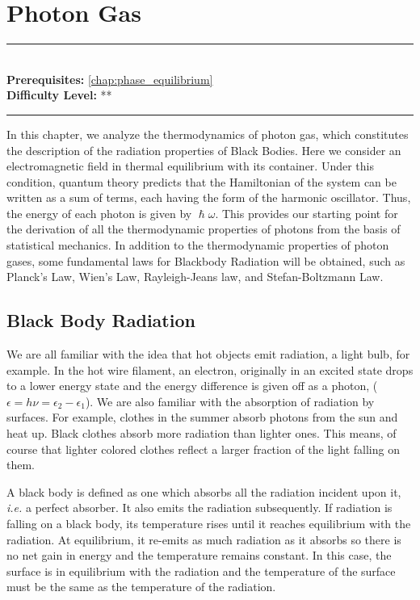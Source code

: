 \documentclass[book.tex]{subfiles}
\begin{document}
\chapter{Photon Gas}

\label{chap:photons}
\noindent\rule{11cm}{0.4pt} \\
\textbf{Prerequisites:}  \autoref{chap:phase_equilibrium}  \\
\textbf{Difficulty Level:} ** \\
\noindent\rule{11cm}{0.4pt}
\vspace{5mm}

In this chapter, we analyze the thermodynamics of photon gas, which constitutes the description of the radiation properties of Black Bodies. Here we consider an electromagnetic field in thermal equilibrium with its container. Under this condition, quantum theory predicts that the Hamiltonian of the system can be written as a sum of terms, each having the form of the harmonic oscillator. Thus, the energy of each photon is given by $\hslash\omega$. This provides our starting point for the derivation of all the thermodynamic properties of photons from the basis of statistical mechanics. In addition to the thermodynamic properties of photon gases, some fundamental laws for Blackbody Radiation will be obtained, such as Planck's Law, Wien's Law, Rayleigh-Jeans law, and Stefan-Boltzmann Law.

\section{Black Body Radiation}

We are all familiar with the idea that hot objects emit radiation, a light
bulb, for example. In the hot wire filament, an electron, originally in an excited
state drops to a lower energy state and the energy difference is given off as
a photon, ($\epsilon = h\nu = \epsilon_2 -\epsilon_1$). We are also familiar with the absorption of radiation by surfaces. For example, clothes in the summer absorb photons from the sun and heat up. Black clothes absorb more radiation than lighter ones. This means, of course that lighter colored clothes reflect a larger fraction of the light falling on them.

A black body is defined as one which absorbs all the radiation incident upon it, \textit{i.e.} a perfect absorber. It also emits the radiation subsequently. If radiation is falling on a black body, its temperature rises until it reaches equilibrium with the radiation. At equilibrium, it re-emits as much radiation as it absorbs so there is no net gain in energy and the temperature remains constant. In this case, the surface is in equilibrium with the radiation and the temperature of the surface must be the same as the temperature of the radiation.
\end{document}
